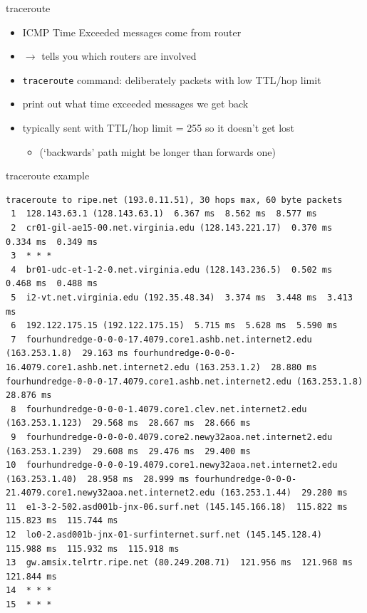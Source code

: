 
\begin{frame}{traceroute}
    \begin{itemize}
    \item ICMP Time Exceeded messages come from router
    \item $\rightarrow$ tells you which routers are involved
    \vspace{.5cm}
    \item<2-> \texttt{traceroute} command: deliberately packets with low TTL/hop limit
    \item<2-> print out what time exceeded messages we get back
    \item<2-> typically sent with TTL/hop limit = 255 so it doesn't get lost
        \begin{itemize}
        \item (`backwards' path might be longer than forwards one)
        \end{itemize}
    \end{itemize}
\end{frame}

\begin{frame}[fragile]{traceroute example}
\begin{Verbatim}[fontsize=\small]
traceroute to ripe.net (193.0.11.51), 30 hops max, 60 byte packets
 1  128.143.63.1 (128.143.63.1)  6.367 ms  8.562 ms  8.577 ms
 2  cr01-gil-ae15-00.net.virginia.edu (128.143.221.17)  0.370 ms  0.334 ms  0.349 ms
 3  * * *
 4  br01-udc-et-1-2-0.net.virginia.edu (128.143.236.5)  0.502 ms  0.468 ms  0.488 ms
 5  i2-vt.net.virginia.edu (192.35.48.34)  3.374 ms  3.448 ms  3.413 ms
 6  192.122.175.15 (192.122.175.15)  5.715 ms  5.628 ms  5.590 ms
 7  fourhundredge-0-0-0-17.4079.core1.ashb.net.internet2.edu (163.253.1.8)  29.163 ms fourhundredge-0-0-0-16.4079.core1.ashb.net.internet2.edu (163.253.1.2)  28.880 ms fourhundredge-0-0-0-17.4079.core1.ashb.net.internet2.edu (163.253.1.8)  28.876 ms
 8  fourhundredge-0-0-0-1.4079.core1.clev.net.internet2.edu (163.253.1.123)  29.568 ms  28.667 ms  28.666 ms
 9  fourhundredge-0-0-0-0.4079.core2.newy32aoa.net.internet2.edu (163.253.1.239)  29.608 ms  29.476 ms  29.400 ms
10  fourhundredge-0-0-0-19.4079.core1.newy32aoa.net.internet2.edu (163.253.1.40)  28.958 ms  28.999 ms fourhundredge-0-0-0-21.4079.core1.newy32aoa.net.internet2.edu (163.253.1.44)  29.280 ms
11  e1-3-2-502.asd001b-jnx-06.surf.net (145.145.166.18)  115.822 ms  115.823 ms  115.744 ms
12  lo0-2.asd001b-jnx-01-surfinternet.surf.net (145.145.128.4)  115.988 ms  115.932 ms  115.918 ms
13  gw.amsix.telrtr.ripe.net (80.249.208.71)  121.956 ms  121.968 ms  121.844 ms
14  * * *
15  * * *
\end{Verbatim}
\end{frame}

